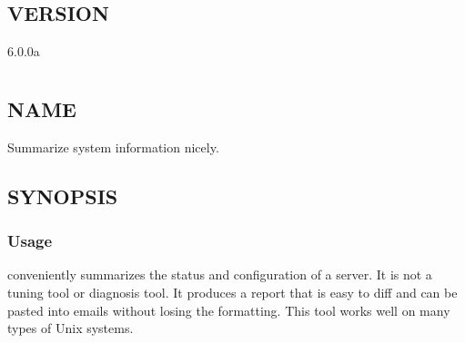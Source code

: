 \documentclass[letterpaper,10pt,english]{sphinxmanual}
\begin{document}
\section{VERSION}
\label{\detokenize{mariadb-summary:version}}
 6.0.0a


\chapter{}
\label{\detokenize{mariadb-system-summary:mariadb-system-summary}}\label{\detokenize{mariadb-system-summary::doc}}

\section{NAME}
\label{\detokenize{mariadb-system-summary:name}}
 \sphinxhyphen{} Summarize system information nicely.


\section{SYNOPSIS}
\label{\detokenize{mariadb-system-summary:synopsis}}

\subsection{Usage}
\label{\detokenize{mariadb-system-summary:usage}}
\begin{sphinxVerbatim}[commandchars=\\\{\}]
\end{sphinxVerbatim}

 conveniently summarizes the status and configuration of
a server. It is not a tuning tool or diagnosis tool.  It produces a report that
is easy to diff and can be pasted into emails without losing the formatting.
This tool works well on many types of Unix systems.
\end{document}
